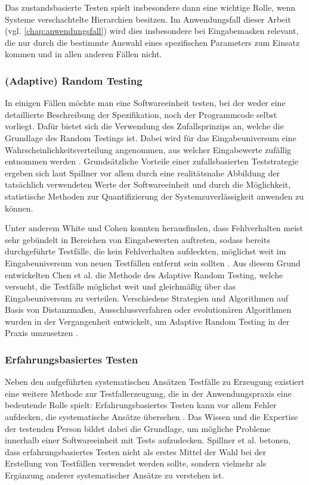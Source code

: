Das zustandsbasierte Testen spielt insbesondere dann eine wichtige Rolle, wenn Systeme verschachtelte Hierarchien besitzen. Im Anwendungsfall dieser Arbeit (vgl. \autoref{chap:anwendungsfall}) wird dies insbesondere bei Eingabemasken relevant, die nur durch die bestimmte Auswahl eines spezifischen Parameters zum Einsatz kommen und in allen anderen Fällen nicht. 

\subsubsection{(Adaptive) Random Testing}

In einigen Fällen möchte man eine Softwareeinheit testen, bei der weder eine detaillierte Beschreibung der Spezifikation, noch der Programmcode selbst vorliegt. Dafür bietet sich die Verwendung des Zufallsprinzips an, welche die Grundlage des Random Testings ist. Dabei wird für das Eingabeuniversum eine Wahrscheinlichkeitsverteilung angenommen, aus welcher Eingabewerte zufällig entnommen werden \cite[S. 141 f.]{spillner2011software}. Grundsätzliche Vorteile einer zufallsbasierten Teststrategie ergeben sich laut Spillner \cite[S. 142]{spillner2011software} vor allem durch eine realitätsnahe Abbildung der tatsächlich verwendeten Werte der Softwareeinheit und durch die Möglichkeit, statistische Methoden zur Quantifizierung der Systemzuverlässigkeit anwenden zu können.

Unter anderem White und Cohen \cite{white1980domain} konnten herausfinden, dass Fehlverhalten meist sehr gebündelt in Bereichen von Eingabewerten auftreten, sodass bereits durchgeführte Testfälle, die kein Fehlverhalten aufdeckten, möglichst weit im Eingabeuniversum von neuen Testfällen entfernt sein sollten \cite{survey2013}. Aus diesem Grund entwickelten Chen et al. \cite{chen2004adaptive} die Methode des Adaptive Random Testing, welche versucht, die Testfälle möglichst weit und gleichmäßig über das Eingabeuniversum zu verteilen. Verschiedene Strategien und Algorithmen auf Basis von Distanzmaßen, Ausschlussverfahren oder evolutionären Algorithmen wurden in der Vergangenheit entwickelt, um Adaptive Random Testing in der Praxis umzusetzen \cite{huang2012adaptive}.

\subsubsection{Erfahrungsbasiertes Testen}

Neben den aufgeführten systematischen Ansätzen Testfälle zu Erzeugung existiert eine weitere Methode zur Testfallerzeugung, die in der Anwendungspraxis eine bedeutende Rolle spielt: Erfahrungsbasiertes Testen kann vor allem Fehler aufdecken, die systematische Ansätze übersehen \cite[S. 210]{spillner2010basiswissen}. Das Wissen und die Expertise der testenden Person bildet dabei die Grundlage, um mögliche Probleme innerhalb einer Softwareeinheit mit Tests aufzudecken. Spillner et al. \cite[S. 213]{spillner2010basiswissen} betonen, dass erfahrungsbasiertes Testen nicht als erstes Mittel der Wahl bei der Erstellung von Testfällen verwendet werden sollte, sondern vielmehr als Ergänzung anderer systematischer Ansätze zu verstehen ist. 

